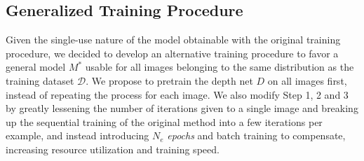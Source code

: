 \subsection{Generalized Training Procedure}
\label{sec:method-general}
Given the single-use nature of the model obtainable with the original training procedure, we decided to develop an alternative training procedure to favor a general model $M^*$ usable for all images belonging to the same distribution as the training dataset $\mathcal{D}$. We propose to pretrain the depth net $D$ on all images first, instead of repeating the process for each image. We also modify Step 1, 2 and 3 by greatly lessening the number of iterations given to a single image and breaking up the sequential training of the original method into a few iterations per example, and instead introducing $N_e$ \textit{epochs} and batch training to compensate, increasing resource utilization and training speed. %
%
%
%

